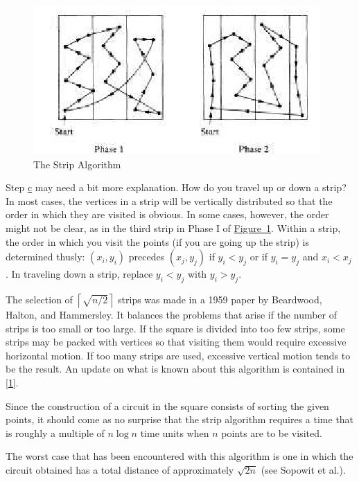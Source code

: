 \documentclass[10pt,]{book}
\theoremstyle{plain}
\theoremstyle{definition}
\theoremstyle{definition}
\theoremstyle{definition}
\theoremstyle{definition}
\theoremstyle{definition}
\numberwithin{equation}{section}
\begin{document}
\begin{figure}
\centering
\includegraphics[width=1\linewidth]{images/fig-strip-alg-tsp.png}
\caption{The Strip Algorithm
                \label{fig-strip-alg-tsp}}
\end{figure}
\par
Step \hyperlink{step-1-3}{c} may need a bit more explanation. How do you travel up or down a strip? In most cases, the vertices in a strip will be vertically distributed so that the order in which they are visited is obvious. In some cases, however, the order might not be clear, as in the third strip in Phase I of
\hyperref[fig-strip-alg-tsp]{Figure~\ref{fig-strip-alg-tsp}}. Within a strip, the order in which you visit the points (if you are going up the strip) is determined thusly: \(\left(x_i,y_i\right)\)
precedes \(\left(x_j,y_j\right)\) if \(y_i <y_j\) or if \(y_i=y_j\) and \(x_i < x_j\) . In traveling down a strip, replace \(y_i < y_j\) with \(y_i >y_j\).%
\par
The selection of \(\left\lceil \sqrt{n/2}\right\rceil\) strips was made in a 1959 paper by Beardwood, Halton, and Hammersley. It balances the problems
that arise if the number of strips is too small or too large. If the square is divided into too few strips, some strips may be packed with vertices
so that visiting them would require excessive horizontal motion. If too many strips are used, excessive vertical motion tends to be the result. An update on what is known about this algorithm is contained in \hyperlink{biblio-sopowit-1983}{[1]}.%
\par
Since the construction of a circuit in the square consists of sorting the given points, it should come as no surprise that the strip algorithm requires
a time that is roughly a multiple of \(n \log  n\) time units when \(n\) points are to be visited.%
\par
The worst case that has been encountered with this algorithm is one in which the circuit obtained has a total distance of approximately \(\sqrt{2n}\)
(see Sopowit et al.).%
\typeout{************************************************}
\typeout{************************************************}
\end{document}
